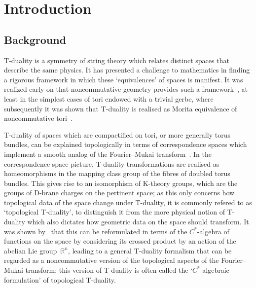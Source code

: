 \documentclass[pdftex]{sigma}
\numberwithin{equation}{section}
\newcommand{\R}{\real}
\newcommand{\real}{{\mathbb R}} %
\begin{document}


{}
{}

{\small
\tableofcontents
}
\renewcommand{\thefootnote}{\arabic{footnote}}
\setcounter{footnote}{0}

\section{Introduction}\label{sec:intro}

\subsection{Background}

T-duality is a symmetry of string theory which relates distinct
spaces that describe the same physics. It has presented a challenge to
mathematics in finding a rigorous framework in which these
`equivalences' of spaces is manifest. It was realized early on that
noncommutative geometry provides such a
framework~\cite{Frohlich1993,Lizzi1997}, at least in the
simplest cases of tori endowed with a trivial
gerbe, where subsequently it was shown that T-duality is realised as
Morita equivalence of noncommutative
tori~\cite{Brace:1998ku,Landi1998,Pioline1999,Schwarz1998,Seiberg1999}.

T-duality of spaces which are compactified on tori, or more generally
torus bundles, can be explained topologically
in terms of correspondence spaces which implement a smooth analog of the
Fourier--Mukai transform~\cite{Hori1999}. In the correspondence space
picture, T-duality transformations are realised as homeomorphisms in the
mapping class group of the fibres of doubled torus bundles. This gives rise to an
isomorphism of K-theory groups, which are the groups of D-brane
charges on the pertinent space; as this only concerns how topological
data of the space change under T-duality, it is commonly refered to as
`topological T-duality', to distinguish it from the more physical
notion of T-duality which also dictates how geometric data on
the space should transform. It was shown by~\cite{Mathai2004} that
this can be reformulated in terms of the $C^*$-algebra of functions on
the space by considering its crossed product by an action of the
abelian Lie group~$\R^n$, leading to a general T-duality formalism
that can be regarded as a noncommutative version of the topological
aspects of the Fourier--Mukai transform; this version of T-duality is
often called the `$C^*$-algebraic formulation' of topological
T-duality.
\end{document}
